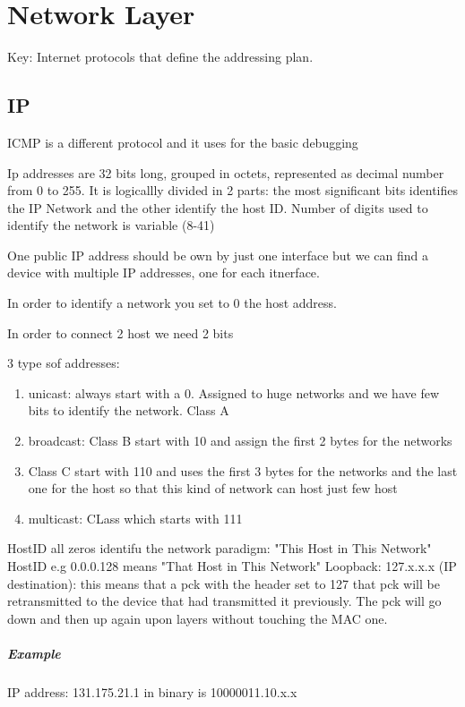 \chapter{Network Layer}
Key: Internet protocols that define the addressing plan. 

\section{IP}
ICMP is a different protocol and it uses for the basic debugging

Ip addresses are 32 bits long, grouped in octets, represented as decimal number from 0 to 255.
It is logicallly divided in 2 parts: the most significant bits identifies the IP Network and the other identify the host ID. Number of digits used to identify the network is variable (8-41)

One public IP address should be own by just one interface but we can find a device with multiple IP addresses, one for each itnerface. 

In order to identify a network you set to 0 the host address.

In order to connect 2 host we need 2 bits  
 
3 type sof addresses:
\begin{enumerate}
\item unicast: always start with a 0. Assigned to huge networks and we have few bits to identify the network. Class A 
\item broadcast: Class B start with 10 and assign the first 2 bytes for the networks 
\item Class C start with 110 and uses the first 3 bytes for the networks and the last one for the host so that this kind of network can host just few host 
\item multicast: CLass which starts with 111
\end{enumerate}

HostID all zeros identifu the network paradigm: "This Host in This Network"
HostID  e.g 0.0.0.128 means "That Host in This Network"
Loopback: 127.x.x.x  (IP destination): this means that a pck with the header set to 127 that pck will be retransmitted to the device that had transmitted it previously. The pck will go down and then up again upon layers without touching the MAC one.

\paragraph{Example}
IP address: 131.175.21.1 in binary is 10000011.10.x.x

